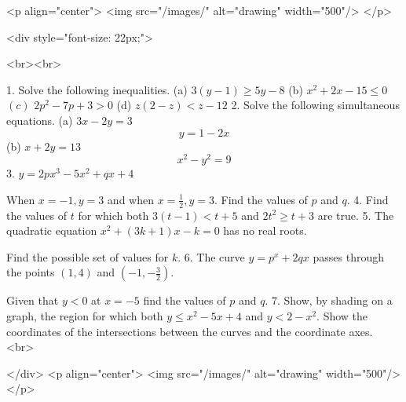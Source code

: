 <p align="center">
<img src="/images/" alt="drawing" width="500"/>
</p>

<div style="font-size: 22px;">

<br><br>

1. Solve the following inequalities.
(a) $3(y-1) \geq 5 y-8$
(b) $x^{2}+2 x-15 \leq 0$
\((c)\) $2 p^{2}-7 p+3>0$
(d) $z(2-z)<z-12$
2. Solve the following simultaneous equations.
(a) $3 x-2 y=3$
$$
y=1-2 x
$$
(b) $x+2 y=13$
$$
x^{2}-y^{2}=9
$$
3. $y=2 p x^{3}-5 x^{2}+q x+4$

When $x=-1, y=3$ and when $x=\frac{1}{2}, y=3$. Find the values of $p$ and $q$.
4. Find the values of $t$ for which both $3(t-1)<t+5$ and $2 t^{2} \geq t+3$ are true.
5. The quadratic equation $x^{2}+(3 k+1) x-k=0$ has no real roots.

Find the possible set of values for $k$.
6. The curve $y=p^{x}+2 q x$ passes through the points $(1,4)$ and $\left(-1,-\frac{3}{2}\right)$.

Given that $y<0$ at $x=-5$ find the values of $p$ and $q$.
7. Show, by shading on a graph, the region for which both $y \leq x^{2}-5 x+4$ and $y<2-x^{2}$. Show the coordinates of the intersections between the curves and the coordinate axes.
<br>

</div>
<p align="center">
<img src="/images/" alt="drawing" width="500"/>
</p>

